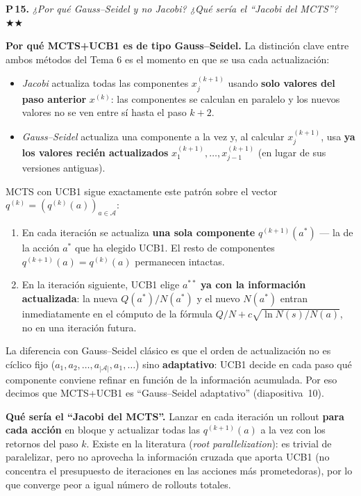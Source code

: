 \documentclass[11pt,a4paper]{article}
\newcommand{\preg}[2]{%
  \par\medskip
  \noindent\textbf{P\,#1.} \emph{#2}\par\smallskip}
\newcommand{\resp}[1]{%
  \noindent #1\par}
\begin{document}
\preg{15}{¿Por qué Gauss--Seidel y no Jacobi? ¿Qué sería el ``Jacobi del
MCTS''? \hfill$\bigstar\bigstar$}
\resp{%
\textbf{Por qué MCTS+UCB1 es de tipo Gauss--Seidel.}
La distinción clave entre ambos métodos del Tema 6 es el momento en que
se usa cada actualización:
\begin{itemize}\setlength{\itemsep}{0pt}
  \item \emph{Jacobi} actualiza todas las componentes $x_j^{(k+1)}$ usando
        \textbf{solo valores del paso anterior} $x^{(k)}$: las
        componentes se calculan en paralelo y los nuevos valores no se
        ven entre sí hasta el paso $k{+}2$.
  \item \emph{Gauss--Seidel} actualiza una componente a la vez y, al
        calcular $x_j^{(k+1)}$, usa \textbf{ya los valores recién
        actualizados} $x_1^{(k+1)},\dots,x_{j-1}^{(k+1)}$ (en lugar de
        sus versiones antiguas).
\end{itemize}
MCTS con UCB1 sigue exactamente este patrón sobre el vector
$q^{(k)}=(q^{(k)}(a))_{a\in\mathcal{A}}$:
\begin{enumerate}\setlength{\itemsep}{0pt}
  \item En cada iteración se actualiza \textbf{una sola componente}
        $q^{(k+1)}(a^*)$ --- la de la acción $a^*$ que ha elegido UCB1.
        El resto de componentes $q^{(k+1)}(a)=q^{(k)}(a)$ permanecen
        intactas.
  \item En la iteración siguiente, UCB1 elige $a^{**}$ \textbf{ya con la
        información actualizada}: la nueva $Q(a^*)/N(a^*)$ y el nuevo
        $N(a^*)$ entran inmediatamente en el cómputo de la fórmula
        $Q/N + c\sqrt{\ln N(s)/N(a)}$, no en una iteración futura.
\end{enumerate}
La diferencia con Gauss--Seidel clásico es que el orden de actualización
no es cíclico fijo ($a_1, a_2, \dots, a_{|\mathcal{A}|}, a_1, \dots$) sino
\textbf{adaptativo}: UCB1 decide en cada paso qué componente conviene
refinar en función de la información acumulada. Por eso decimos que
MCTS+UCB1 es ``Gauss--Seidel adaptativo'' (diapositiva~10).

\smallskip
\textbf{Qué sería el ``Jacobi del MCTS''.}
Lanzar en cada iteración un rollout \textbf{para cada acción} en bloque
y actualizar todas las $q^{(k+1)}(a)$ a la vez con los retornos del paso
$k$. Existe en la literatura (\emph{root parallelization}): es trivial
de paralelizar, pero no aprovecha la información cruzada que aporta UCB1
(no concentra el presupuesto de iteraciones en las acciones más
prometedoras), por lo que converge peor a igual número de rollouts
totales.}
\end{document}
